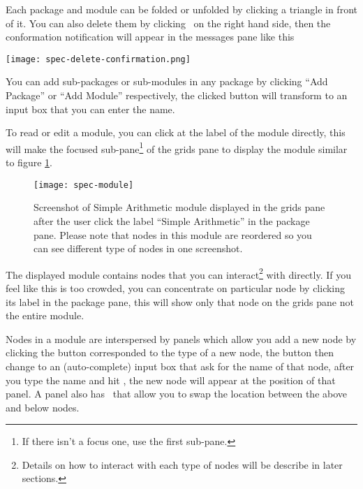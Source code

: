 \documentclass[master.tex]{subfiles}
\begin{document}
Each package and module can be folded or unfolded by clicking a triangle in
front of it. You can also delete them by clicking \closeButton\ on the right
hand side, then the conformation notification will appear in the messages pane
like this

\texttt{[image: spec-delete-confirmation.png]}

You can add sub-packages or sub-modules in any package by clicking ``Add
Package'' or ``Add Module'' respectively, the clicked button will transform to
an input box that you can enter the name.

To read or edit a module, you can click at the label of the module directly,
this will make the focused sub-pane\footnote{If there isn't a focus one, use the
  first sub-pane.} of the grids pane to display the module similar to figure
\ref{fig:specification-module}.

\begin{figure}[H]
    \centering
    \texttt{[image: spec-module]}
    \caption{Screenshot of Simple Arithmetic module displayed in the grids pane
      after the user click the label ``Simple Arithmetic'' in the package pane.
      Please note that nodes in this module are reordered so you can see
      different type of nodes in one screenshot.}
    \label{fig:specification-module}
\end{figure}

The displayed module contains nodes that you can interact\footnote{Details on
  how to interact with each type of nodes will be describe in later sections.}
with directly. If you feel like this is too crowded, you can concentrate on
particular node by clicking its label in the package pane, this will show only
that node on the grids pane not the entire module.

Nodes in a module are interspersed by panels which allow you add a new node by
clicking the button corresponded to the type of a new node, the button then
change to an (auto-complete) input box that ask for the name of that node, after
you type the name and hit , the new node will appear at the
position of that panel. A panel also has \swapButton\ that allow you to swap the
location between the above and below nodes.
\end{document}

